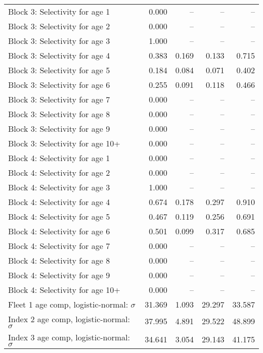 \documentclass[
]{article}
\begin{document}
\begin{landscape}
\begin{longtable}[t]{lrrrr}
Block 3: Selectivity for age 1 & 0.000 & -- & -- & --\\
Block 3: Selectivity for age 2 & 0.000 & -- & -- & --\\
Block 3: Selectivity for age 3 & 1.000 & -- & -- & --\\
Block 3: Selectivity for age 4 & 0.383 & 0.169 & 0.133 & 0.715\\
\addlinespace
Block 3: Selectivity for age 5 & 0.184 & 0.084 & 0.071 & 0.402\\
Block 3: Selectivity for age 6 & 0.255 & 0.091 & 0.118 & 0.466\\
Block 3: Selectivity for age 7 & 0.000 & -- & -- & --\\
Block 3: Selectivity for age 8 & 0.000 & -- & -- & --\\
Block 3: Selectivity for age 9 & 0.000 & -- & -- & --\\
\addlinespace
Block 3: Selectivity for age 10+ & 0.000 & -- & -- & --\\
Block 4: Selectivity for age 1 & 0.000 & -- & -- & --\\
Block 4: Selectivity for age 2 & 0.000 & -- & -- & --\\
Block 4: Selectivity for age 3 & 1.000 & -- & -- & --\\
Block 4: Selectivity for age 4 & 0.674 & 0.178 & 0.297 & 0.910\\
\addlinespace
Block 4: Selectivity for age 5 & 0.467 & 0.119 & 0.256 & 0.691\\
Block 4: Selectivity for age 6 & 0.501 & 0.099 & 0.317 & 0.685\\
Block 4: Selectivity for age 7 & 0.000 & -- & -- & --\\
Block 4: Selectivity for age 8 & 0.000 & -- & -- & --\\
Block 4: Selectivity for age 9 & 0.000 & -- & -- & --\\
\addlinespace
Block 4: Selectivity for age 10+ & 0.000 & -- & -- & --\\
Fleet 1 age comp, logistic-normal: $\sigma$ & 31.369 & 1.093 & 29.297 & 33.587\\
Index 2 age comp, logistic-normal: $\sigma$ & 37.995 & 4.891 & 29.522 & 48.899\\
Index 3 age comp, logistic-normal: $\sigma$ & 34.641 & 3.054 & 29.143 & 41.175\\*
\end{longtable}
\end{landscape}
\end{document}

